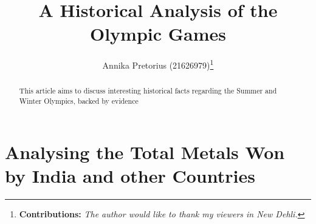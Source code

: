 \documentclass[12pt,preprint, authoryear]{elsarticle}
\numberwithin{equation}{section}
\numberwithin{figure}{section}
\numberwithin{table}{section}
\let\rmarkdownfootnote\footnote%
\def\footnote{\protect\rmarkdownfootnote}
\begin{document}
\begin{frontmatter}  %

\title{A Historical Analysis of the Olympic Games}





\author[Add1]{Annika Pretorius (21626979)\footnote{\textbf{Contributions:}
  \newline \emph{The author would like to thank my viewers in New
  Dehli.}}}
\ead{}





\address[Add1]{Stellenbosch University}


\begin{abstract}
\small{
This article aims to discuss interesting historical facts regarding the
Summer and Winter Olympics, backed by evidence
}
\end{abstract}

\vspace{1cm}





\vspace{0.5cm}

\end{frontmatter}



\pagestyle{fancy}
\chead{}
\rhead{}
\lfoot{}
\rfoot{}
\lhead{}
\cfoot{}


\headsep 35pt %




\hypertarget{analysing-the-total-metals-won-by-india-and-other-countries}{%
\section{Analysing the Total Metals Won by India and other
Countries}\label{analysing-the-total-metals-won-by-india-and-other-countries}}
\end{document}
